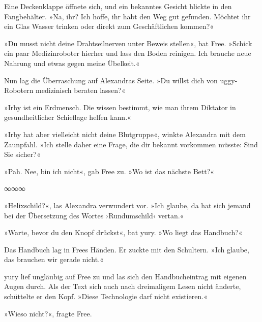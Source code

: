 Eine Deckenklappe öffnete sich, und ein bekanntes Gesicht blickte in den Fangbehälter. »Na, ihr? Ich hoffe, ihr habt den Weg gut gefunden. Möchtet ihr ein Glas Wasser trinken oder direkt zum Geschäftlichen kommen?«

»Du musst nicht deine Drahtseilnerven unter Beweis stellen«, bat Free. »Schick ein paar Medizinroboter hierher und lass den Boden reinigen. Ich brauche neue Nahrung und etwas gegen meine Übelkeit.«

Nun lag die Überraschung auf Alexandras Seite. »Du willst dich von uggy-Robotern medizinisch beraten lassen?«

»Irby ist ein Erdmensch. Die wissen bestimmt, wie man ihrem Diktator in gesundheitlicher Schieflage helfen kann.«

»Irby hat aber vielleicht nicht deine Blutgruppe«, winkte Alexandra mit dem Zaunpfahl. »Ich stelle daher eine Frage, die dir bekannt vorkommen müsste: Sind Sie sicher?«

»Pah. Nee, bin ich nicht«, gab Free zu. »Wo ist das nächste Bett?«

\begin{center}
∞∞∞
\end{center}

»Helixschild?«, las Alexandra verwundert vor. »Ich glaube, da hat sich jemand bei der Übersetzung des Wortes ›Rundumschild‹ vertan.«

»Warte, bevor du den Knopf drückst«, bat yury. »Wo liegt das Handbuch?«

Das Handbuch lag in Frees Händen.  Er zuckte mit den Schultern. »Ich glaube, das brauchen wir gerade nicht.«

yury lief ungläubig auf Free zu und las sich den Handbucheintrag mit eigenen Augen durch. Als der Text sich auch nach dreimaligem Lesen nicht änderte, schüttelte er den Kopf. »Diese Technologie darf nicht existieren.«

»Wieso nicht?«, fragte Free.


